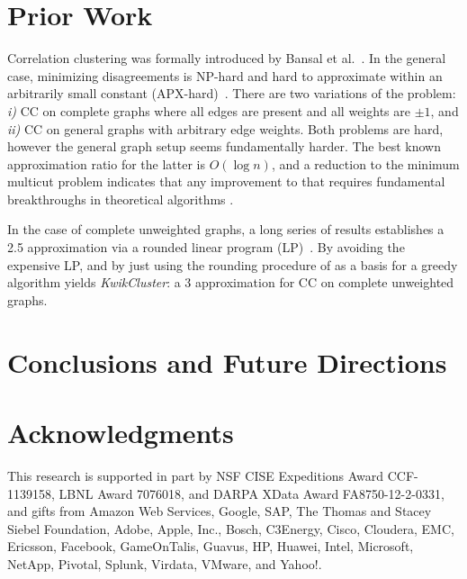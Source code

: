 \documentclass{article} %
\begin{document}
\section{Prior Work}
Correlation clustering was formally introduced by Bansal et al.~\cite{bansal2002correlation}.
In the general case, minimizing disagreements is NP-hard and hard to approximate within an arbitrarily small constant (APX-hard)~\cite{bansal2002correlation,charikar2003clustering}.
There are two variations of the problem: 
{\it i)} CC on complete graphs where all edges are present and all weights are $\pm1$, and 
{\it ii)} CC on general graphs with arbitrary edge weights. %
Both problems are hard, however the general graph setup seems fundamentally harder.
The best known approximation ratio for the latter is $O(\log n)$, and a reduction to the minimum multicut problem indicates that any improvement to that requires fundamental breakthroughs in theoretical algorithms \cite{demaine2006correlation}.

In the case of complete unweighted graphs, a long series of results establishes 
a 2.5 approximation via a rounded linear program (LP)~\cite{ailon2008aggregating}.
By avoiding the expensive LP, and by just using the rounding procedure of \cite{ailon2008aggregating} as a basis for a greedy algorithm yields {\it{KwikCluster}}:
a 3 approximation for CC on complete unweighted graphs.


\section{Conclusions and Future Directions}


\section{Acknowledgments}
This research is supported in part by NSF CISE Expeditions Award CCF-1139158, LBNL Award 7076018, and DARPA XData Award FA8750-12-2-0331, and  gifts from Amazon Web Services, Google, SAP,  The Thomas and Stacey Siebel Foundation, Adobe, Apple, Inc., Bosch, C3Energy, Cisco, Cloudera, EMC, Ericsson, Facebook, GameOnTalis, Guavus, HP, Huawei, Intel, Microsoft, NetApp, Pivotal, Splunk, Virdata, VMware, and Yahoo!.
\appendix
\end{document}

